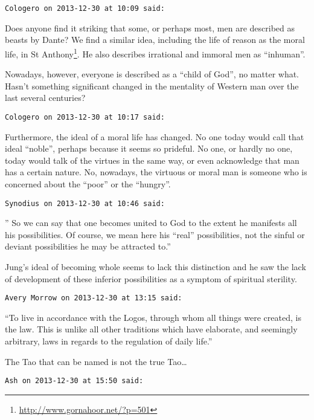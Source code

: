\begin{footnotesize}\begin{sffamily}



\texttt{Cologero on 2013-12-30 at 10:09 said: }

Does anyone find it striking that some, or perhaps most, men are described as beasts by Dante? We find a similar idea, including the life of reason as the moral life, in St Anthony\footnote{\url{http://www.gornahoor.net/?p=501}}. He also describes irrational and immoral men as “inhuman”.

Nowadays, however, everyone is described as a “child of God”, no matter what. Hasn't something significant changed in the mentality of Western man over the last several centuries?


\hfill

\texttt{Cologero on 2013-12-30 at 10:17 said: }

Furthermore, the ideal of a moral life has changed. No one today would call that ideal “noble”, perhaps because it seems so prideful. No one, or hardly no one, today would talk of the virtues in the same way, or even acknowledge that man has a certain nature. No, nowadays, the virtuous or moral man is someone who is concerned about the “poor” or the “hungry”.


\hfill

\texttt{Synodius on 2013-12-30 at 10:46 said: }

” So we can say that one becomes united to God to the extent he manifests all his possibilities. Of course, we mean here his “real” possibilities, not the sinful or deviant possibilities he may be attracted to.”

Jung's ideal of becoming whole seems to lack this distinction and he saw the lack of development of these inferior possibilities as a symptom of spiritual sterility.


\hfill

\texttt{Avery Morrow on 2013-12-30 at 13:15 said: }

“To live in accordance with the Logos, through whom all things were created, is the law. This is unlike all other traditions which have elaborate, and seemingly arbitrary, laws in regards to the regulation of daily life.”

The Tao that can be named is not the true Tao…


\hfill

\texttt{Ash on 2013-12-30 at 15:50 said: }


\end{sffamily}
\end{footnotesize}
